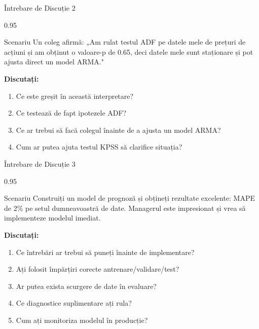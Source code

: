 \documentclass[9pt, aspectratio=169, t]{beamer}
\begin{document}
\begin{frame}{Întrebare de Discuție 2}
    \begin{cminipage}{0.95\textwidth}
    \begin{block}{Scenariu}
        Un coleg afirmă: „Am rulat testul ADF pe datele mele de prețuri de acțiuni și am obținut o valoare-p de 0.65, deci datele mele sunt staționare și pot ajusta direct un model ARMA."
    \end{block}

    \vspace{0.4cm}

    \textbf{Discutați:}
    \begin{enumerate}\setlength{\itemsep}{0pt}
        \item Ce este greșit în această interpretare?
        \item Ce testează de fapt ipotezele ADF?
        \item Ce ar trebui să facă colegul înainte de a ajusta un model ARMA?
        \item Cum ar putea ajuta testul KPSS să clarifice situația?
    \end{enumerate}
    \end{cminipage}
\end{frame}

\begin{frame}{Întrebare de Discuție 3}
    \begin{cminipage}{0.95\textwidth}
    \begin{block}{Scenariu}
        Construiți un model de prognoză și obțineți rezultate excelente: MAPE de 2\% pe setul dumneavoastră de date. Managerul este impresionat și vrea să implementeze modelul imediat.
    \end{block}

    \vspace{0.4cm}

    \textbf{Discutați:}
    \begin{enumerate}\setlength{\itemsep}{0pt}
        \item Ce întrebări ar trebui să puneți înainte de implementare?
        \item Ați folosit împărțiri corecte antrenare/validare/test?
        \item Ar putea exista scurgere de date în evaluare?
        \item Ce diagnostice suplimentare ați rula?
        \item Cum ați monitoriza modelul în producție?
    \end{enumerate}
    \end{cminipage}
\end{frame}
\end{document}
